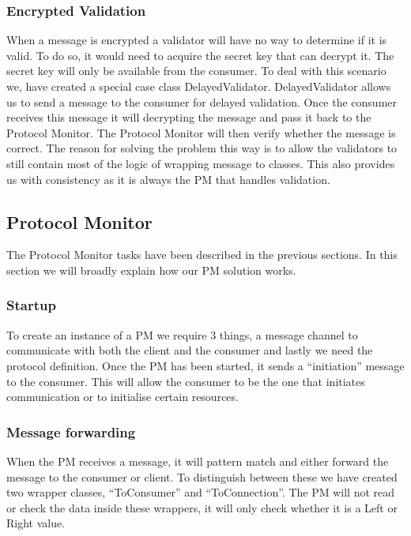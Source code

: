 \subsubsection{Encrypted Validation}
When a message is encrypted a validator will have no way to determine if it is valid. To do so, it would need to acquire the secret key that can decrypt it. The secret key will only be available from the consumer. To deal with this scenario we, have created a special case class DelayedValidator. DelayedValidator allows us to send a message to the consumer for delayed validation. Once the consumer receives this message it will decrypting the message and pass it back to the Protocol Monitor. The Protocol Monitor will then verify whether the message is correct. The reason for solving the problem this way is to allow the validators to still contain most of the logic of wrapping message to classes. This also provides us with consistency as it is always the PM that handles validation.

   
%


\subsection{Protocol Monitor}
The Protocol Monitor tasks have been described in the previous sections. In this section we will broadly explain how our PM solution works.
\subsubsection{Startup}
To create an instance of a PM we require 3 things, a message channel to communicate with both the client and the consumer and lastly we need the protocol definition. Once the PM has been started, it sends a ``initiation'' message to the consumer. This will allow the consumer to be the one that initiates communication or to initialise certain resources.

\subsubsection{Message forwarding}
When the PM receives a message, it will pattern match and either forward the message to the consumer or client. To distinguish between these we have created two wrapper classes, ``ToConsumer'' and ``ToConnection''. The PM will not read or check the data inside these wrappers, it will only check whether it is a Left or Right value. 
